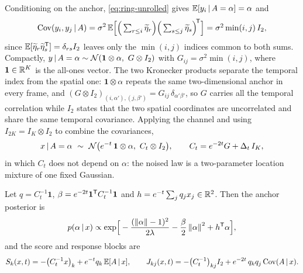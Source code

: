 Conditioning on the anchor, \eqref{eq:ring-unrolled} gives
$\mathbb{E}[y_i \,|\, A = \alpha] = \alpha$ and
\begin{equation}
  \mathrm{Cov}(y_i, y_j \,|\, A)
  = \sigma^2\, \mathbb{E}\Big[\Big(\textstyle\sum_{r \le i}\widetilde\eta_r\Big)
      \Big(\textstyle\sum_{s \le j}\widetilde\eta_s\Big)^{\!\mathsf{T}}\Big]
  = \sigma^2 \min(i,j)\, I_2 ,
  \label{eq:ring-K}
\end{equation}
since $\mathbb{E}[\widetilde\eta_r \widetilde\eta_s^{\mathsf{T}}] = \delta_{rs} I_2$ leaves only
the $\min(i,j)$ indices common to both sums. Compactly,
$y \,|\, A = \alpha \sim \mathcal{N}(\mathbf{1} \otimes \alpha,\ G \otimes I_2)$
with $G_{ij} = \sigma^2\min(i,j)$, where $\mathbf 1 \in \mathbb{R}^K$ is the
all-ones vector. The two Kronecker products separate the temporal index from
the spatial one: $\mathbf 1 \otimes \alpha$ repeats the same two-dimensional
anchor in every frame, and
$(G \otimes I_2)_{(i,\alpha'),(j,\beta')}
= G_{ij}\,\delta_{\alpha'\beta'}$, so $G$ carries all the temporal
correlation while $I_2$ states that the two spatial coordinates are
uncorrelated and share the same temporal covariance. Applying the channel and
using $I_{2K} = I_K \otimes I_2$ to combine the covariances,
\begin{equation}
  x \,|\, A = \alpha
  \ \sim\ \mathcal{N}\big(e^{-t}\,\mathbf 1 \otimes \alpha,\ C_t \otimes I_2\big),
  \qquad
  C_t = e^{-2t}G + \Delta_t\, I_K ,
  \label{eq:ring-Ct}
\end{equation}
in which $C_t$ does not depend on $\alpha$: the noised law is a two-parameter
location mixture of one fixed Gaussian.

\begin{proposition}\label{prop:ring-exact}
Let $q = C_t^{-1}\mathbf 1$, $\beta = e^{-2t}\mathbf 1^{\mathsf{T}} C_t^{-1}\mathbf 1$
and $h = e^{-t}\sum_j q_j x_j \in \mathbb{R}^2$. Then the anchor posterior is
\begin{equation}
  p(\alpha \,|\, x) \propto
  \exp\!\Big[ -\frac{(\left\lVert \alpha \right\rVert-1)^2}{2\lambda}
              - \frac{\beta}{2}\left\lVert \alpha \right\rVert^2 + h^{\mathsf{T}}\alpha \Big] ,
  \label{eq:ring-anchor-posterior}
\end{equation}
and the score and response blocks are
\begin{equation}
  S_k(x,t) = -\big(C_t^{-1}x\big)_k + e^{-t} q_k\, \mathbb{E}[A \,|\, x] ,
  \qquad
  J_{kj}(x,t) = -\big(C_t^{-1}\big)_{kj} I_2
                + e^{-2t}\, q_k q_j\, \mathrm{Cov}(A \,|\, x) .
  \label{eq:ring-surrogate-score}
\end{equation}
\end{proposition}

